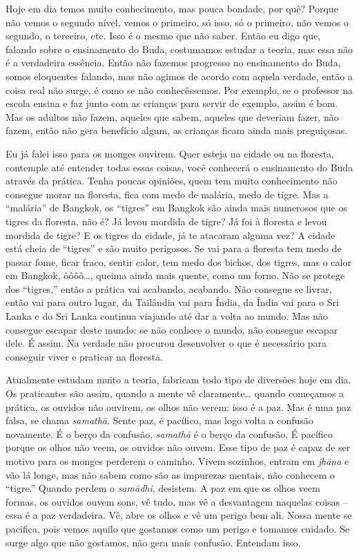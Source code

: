 Hoje em dia temos muito conhecimento, mas pouca bondade, por quê?
Porque não vemos o segundo nível, vemos o primeiro, só isso, só o
primeiro, não vemos o segundo, o terceiro, etc. Isso é o mesmo que não
saber. Então eu digo que, falando sobre o ensinamento do Buda,
costumamos estudar a teoria, mas essa não é a verdadeira essência.
Então não fazemos progresso no ensinamento do Buda, somos eloquentes
falando, mas não agimos de acordo com aquela verdade, então a coisa
real não surge, é como se não conhecêssemos. Por exemplo, se o
professor na escola ensina e faz junto com as crianças para servir de
exemplo, assim é bom. Mas os adultos não fazem, aqueles que sabem,
aqueles que deveriam fazer, não fazem, então não gera benefício algum,
as crianças ficam ainda mais preguiçosas. 

Eu já falei isso para os monges ouvirem. Quer esteja na cidade ou na
floresta, contemple até entender todas essas coisas, você conhecerá o
ensinamento do Buda através da prática. Tenha poucas opiniões, quem tem
muito conhecimento não consegue morar na floresta, fica com medo de
malária, medo de tigre. Mas a “malária” de Bangkok, os “tigres” em
Bangkok são ainda mais numerosos que os tigres da floresta, não é? Já
levou mordida de tigre? Já foi à floresta e levou mordida de tigre? E
os tigres da cidade, já te atacaram alguma vez? A cidade está cheia de
“tigres” e são muito perigosos. Se vai para a floresta tem medo de
passar fome, ficar fraco, sentir calor, tem medo dos bichos, dos
tigres, mas o calor em Bangkok, ôôôô\ldots{}, queima ainda mais quente, como
um forno. Não se protege dos “tigres,” então a prática vai acabando,
acabando. Não consegue se livrar, então vai para outro lugar, da
Tailândia vai para Índia, da Índia vai para o Sri Lanka e do Sri Lanka
continua viajando até dar a volta ao mundo. Mas não consegue escapar
deste mundo: se não conhece o mundo, não consegue escapar dele. É
assim. Na verdade não procurou desenvolver o que é necessário para
conseguir viver e praticar na floresta.

Atualmente estudam muito a teoria, fabricam todo tipo de diversões
hoje em dia. Os praticantes são assim, quando a mente vê claramente\ldots{}
quando começamos a prática, os ouvidos não ouvirem, os olhos não verem:
isso é a paz. Mas é uma paz falsa, se chama \emph{samathā}. Sente
paz, é pacífico, mas logo volta a confusão novamente. É o berço da
confusão, \emph{samathā} é o berço da confusão. É pacífico porque
os olhos não veem, os ouvidos não ouvem. Esse tipo de paz é capaz de
ser motivo para os monges perderem o caminho. Vivem sozinhos, entram em
\emph{jhāna} e vão lá longe, mas não sabem como são as impurezas
mentais, não conhecem o “tigre.” Quando perdem o \emph{samādhi},
desistem. A paz em que os olhos veem formas, os ouvidos ouvem sons, vê
tudo, mas vê a desvantagem naquelas coisas – essa é a paz verdadeira.
Vê, abre os olhos e vê um perigo bem ali. Nossa mente se pacifica, pois
vemos aquilo que gostamos como um perigo e tomamos cuidado. Se surge
algo que não gostamos, não gera mais confusão. Entendam isso. 


